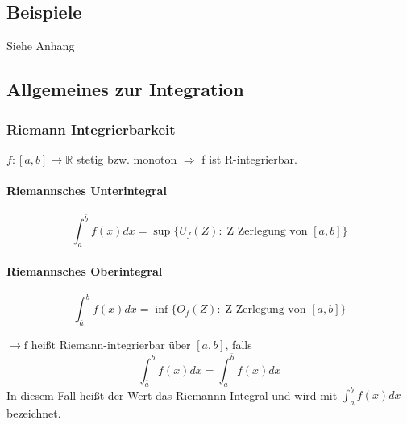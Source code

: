 \documentclass[12pt,a4paper]{article}%
\numberwithin{equation}{section}
\newcommand{\R}{\mathbb{R}} %
\newcommand{\subsubsubsection}{\paragraph}
\numberwithin{equation}{subsection}
\begin{document}
\subsection{Beispiele}
Siehe Anhang

\subsection{Allgemeines zur Integration}
\subsubsection{Riemann Integrierbarkeit}
$f:[a,b] \rightarrow \R$ stetig bzw. monoton \newline
$\Rightarrow$ f ist R-integrierbar.

\subsubsubsection{Riemannsches Unterintegral}
\begin{equation}
\int_{a}^{\bar{b}} f(x) dx = \sup\{U_f(Z): \; \text{Z Zerlegung von }[a,b]\}
\end{equation}


\subsubsubsection{Riemannsches Oberintegral}
\begin{equation}
\int_{\bar{a}}^{b} f(x) dx = \inf\{O_f(Z): \; \text{Z Zerlegung von }[a,b]\}
\end{equation}

$\rightarrow \text{f heißt Riemann-integrierbar über }[a,b]$, falls
\begin{equation}
\int_{\bar{a}}^{b} f(x) dx = \int_a^{\bar{b}} f(x) dx
\end{equation}
\newline
In diesem Fall heißt der Wert das Riemannn-Integral und wird mit $\int_a^b f(x)dx$ bezeichnet.
\end{document}
